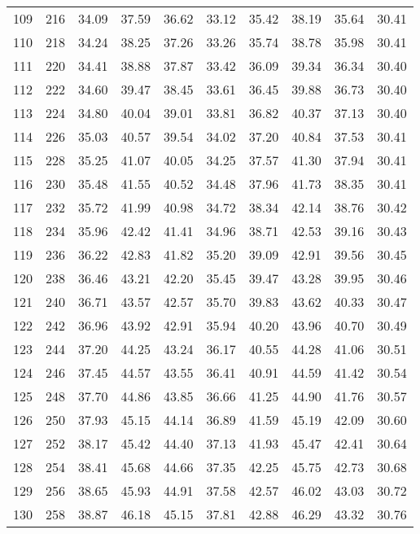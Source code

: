 \begin{longtable}{rrllllllll}
		109 & 216 & 34.09 & 37.59 & 36.62 & 33.12 & 35.42 & 38.19 & 35.64 & 30.41 \\ 
		110 & 218 & 34.24 & 38.25 & 37.26 & 33.26 & 35.74 & 38.78 & 35.98 & 30.41 \\ 
		111 & 220 & 34.41 & 38.88 & 37.87 & 33.42 & 36.09 & 39.34 & 36.34 & 30.40 \\ 
		112 & 222 & 34.60 & 39.47 & 38.45 & 33.61 & 36.45 & 39.88 & 36.73 & 30.40 \\ 
		113 & 224 & 34.80 & 40.04 & 39.01 & 33.81 & 36.82 & 40.37 & 37.13 & 30.40 \\ 
		114 & 226 & 35.03 & 40.57 & 39.54 & 34.02 & 37.20 & 40.84 & 37.53 & 30.41 \\ 
		115 & 228 & 35.25 & 41.07 & 40.05 & 34.25 & 37.57 & 41.30 & 37.94 & 30.41 \\ 
		116 & 230 & 35.48 & 41.55 & 40.52 & 34.48 & 37.96 & 41.73 & 38.35 & 30.41 \\ 
		117 & 232 & 35.72 & 41.99 & 40.98 & 34.72 & 38.34 & 42.14 & 38.76 & 30.42 \\ 
		118 & 234 & 35.96 & 42.42 & 41.41 & 34.96 & 38.71 & 42.53 & 39.16 & 30.43 \\ 
		119 & 236 & 36.22 & 42.83 & 41.82 & 35.20 & 39.09 & 42.91 & 39.56 & 30.45 \\ 
		120 & 238 & 36.46 & 43.21 & 42.20 & 35.45 & 39.47 & 43.28 & 39.95 & 30.46 \\ 
		121 & 240 & 36.71 & 43.57 & 42.57 & 35.70 & 39.83 & 43.62 & 40.33 & 30.47 \\ 
		122 & 242 & 36.96 & 43.92 & 42.91 & 35.94 & 40.20 & 43.96 & 40.70 & 30.49 \\ 
		123 & 244 & 37.20 & 44.25 & 43.24 & 36.17 & 40.55 & 44.28 & 41.06 & 30.51 \\ 
		124 & 246 & 37.45 & 44.57 & 43.55 & 36.41 & 40.91 & 44.59 & 41.42 & 30.54 \\ 
		125 & 248 & 37.70 & 44.86 & 43.85 & 36.66 & 41.25 & 44.90 & 41.76 & 30.57 \\ 
		126 & 250 & 37.93 & 45.15 & 44.14 & 36.89 & 41.59 & 45.19 & 42.09 & 30.60 \\ 
		127 & 252 & 38.17 & 45.42 & 44.40 & 37.13 & 41.93 & 45.47 & 42.41 & 30.64 \\ 
		128 & 254 & 38.41 & 45.68 & 44.66 & 37.35 & 42.25 & 45.75 & 42.73 & 30.68 \\ 
		129 & 256 & 38.65 & 45.93 & 44.91 & 37.58 & 42.57 & 46.02 & 43.03 & 30.72 \\ 
		130 & 258 & 38.87 & 46.18 & 45.15 & 37.81 & 42.88 & 46.29 & 43.32 & 30.76 \\ 

\end{longtable}
